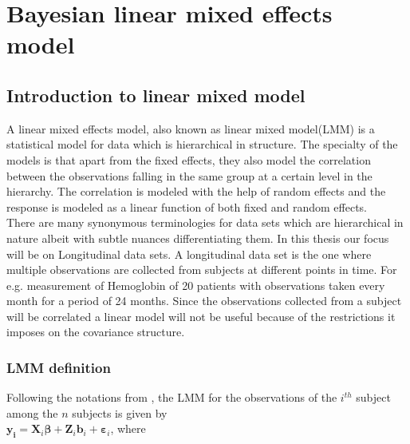 
\chapter{Bayesian linear mixed effects model}
\label{ch : blmm}

\section{Introduction to linear mixed model}
\label{sec : lmm}
A linear mixed effects model, also known as linear mixed model(LMM) is a statistical model for data which is hierarchical in structure. The specialty of the models is that apart from the fixed effects, they also model the correlation between the observations falling in the same group at a certain level in the hierarchy. The correlation is modeled with the help of random effects and the response is modeled as a linear function of both fixed and random effects.\\

There are many synonymous terminologies for data sets which are hierarchical in nature albeit with subtle nuances differentiating them. In this thesis our focus will be on Longitudinal data sets. A longitudinal data set is the one where multiple observations are collected from subjects at different points in time. For e.g. measurement of Hemoglobin of 20 patients with observations taken every month for a period of 24 months. Since the observations collected from a subject will be correlated a linear model will not be useful because of the restrictions it imposes on the covariance structure.\\

\subsection{LMM definition}
\label{subsec : lmm_definition}
Following the notations from \citet{lesaffre_bayesian_2012}, the LMM for the observations of the $i^{th}$ subject among the $n$ subjects is given by\\

$\boldsymbol{y_i} = \boldsymbol{X}_{i}\boldsymbol{\beta} + \boldsymbol{Z}_{i}\boldsymbol{b}_{i} + \boldsymbol{\varepsilon}_{i}$, where\\

